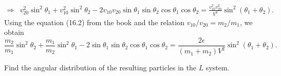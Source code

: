 \begin{problem}
{\begin{align*}
    \Rightarrow& v_{20}^2 \sin^2{\theta_1} + v_{10}^2 \sin^2{\theta_2} - 2 v_{10}v_{20}\sin{\theta_1}\sin{\theta_2}\cos{\theta_1}\cos{\theta_2} = \frac{v_{10}^2v_{20}^2}{V^2}\sin^2{(\theta_1+\theta_2)}.
\end{align*}
Using the equation (16.2) from the book and the relation $v_{10}/v_{20} = m_2/m_1$, we obtain
}
{
\begin{equation*}
    \frac{m_2}{m_1} \sin^2{\theta_2} + \frac{m_1}{m_2} \sin^2{\theta_1} - 2 \sin{\theta_1}\sin{\theta_2}\cos{\theta_1}\cos{\theta_2} = \frac{2\epsilon}{(m_1+m_2)V^2} \sin^2{(\theta_1+\theta_2)}.
\end{equation*}
}
\end{problem}


\begin{problem}
{
    Find the angular distribution of the resulting particles in the $L$ system.
}
{
}
{
}
\end{problem}
